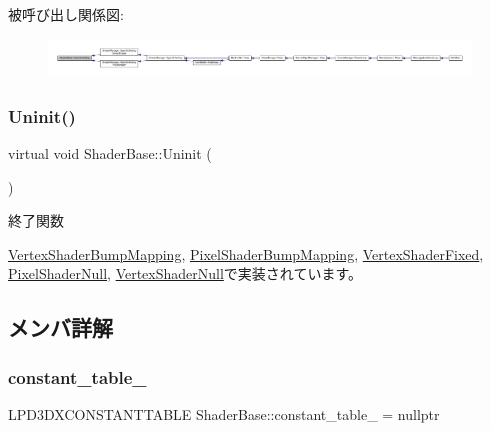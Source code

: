 被呼び出し関係図\+:
\nopagebreak
\begin{figure}[H]
\begin{center}
\leavevmode
\includegraphics[width=350pt]{class_shader_base_ac78c78ede3b8e48cf28b739b97456620_icgraph}
\end{center}
\end{figure}
\mbox{\label{class_shader_base_a784edfa81bec4d08a257ed4f02c61222}} 
\subsubsection{\texorpdfstring{Uninit()}{Uninit()}}
{\footnotesize\ttfamily virtual void Shader\+Base\+::\+Uninit (\begin{DoxyParamCaption}{ }\end{DoxyParamCaption})\hspace{0.3cm}{\ttfamily [pure virtual]}}



終了関数 



\mbox{\hyperlink{class_vertex_shader_bump_mapping_abed4e0aa9655fa7a7a21e03d00e7c0e5}{Vertex\+Shader\+Bump\+Mapping}}, \mbox{\hyperlink{class_pixel_shader_bump_mapping_a004f731db6dab6b59949baed4a5a32d7}{Pixel\+Shader\+Bump\+Mapping}}, \mbox{\hyperlink{class_vertex_shader_fixed_a49f630aee4757c8fd8bae886f22dfeb0}{Vertex\+Shader\+Fixed}}, \mbox{\hyperlink{class_pixel_shader_null_ae5ee2fa95e5da787918ccbd1877cd0ef}{Pixel\+Shader\+Null}}, \mbox{\hyperlink{class_vertex_shader_null_a16334df4ac02db3dd63f042622032301}{Vertex\+Shader\+Null}}で実装されています。



\subsection{メンバ詳解}
\mbox{\label{class_shader_base_a9b6b2a5920dd57ac463040224fb64b68}} 
\subsubsection{\texorpdfstring{constant\+\_\+table\+\_\+}{constant\_table\_}}
{\footnotesize\ttfamily L\+P\+D3\+D\+X\+C\+O\+N\+S\+T\+A\+N\+T\+T\+A\+B\+LE Shader\+Base\+::constant\+\_\+table\+\_\+ = nullptr\hspace{0.3cm}{\ttfamily [private]}}



